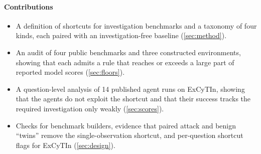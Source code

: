 \paragraph{Contributions}
\begin{itemize}\setlength\itemsep{1pt}
\item A definition of shortcuts for investigation benchmarks and a taxonomy of four kinds, each paired with an investigation-free baseline (\cref{sec:method}).
\item An audit of four public benchmarks and three constructed environments, showing that each admits a rule that reaches or exceeds a large part of reported model scores (\cref{sec:floors}).
\item A question-level analysis of 14 published agent runs on ExCyTIn, showing that the agents do not exploit the shortcut and that their success tracks the required investigation only weakly (\cref{sec:scores}).
\item Checks for benchmark builders, evidence that paired attack and benign ``twins'' remove the single-observation shortcut, and per-question shortcut flags for ExCyTIn (\cref{sec:design}).
\end{itemize}
